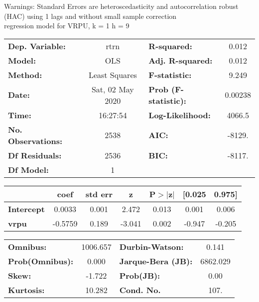 Warnings: \newline
 [1] Standard Errors are heteroscedasticity and autocorrelation robust (HAC) using 1 lags and without small sample correction\\ 

regression model for VRPU, k = 1 h = 9\begin{center}
\begin{tabular}{lclc}
\toprule
\textbf{Dep. Variable:}    &       rtrn       & \textbf{  R-squared:         } &     0.012   \\
\textbf{Model:}            &       OLS        & \textbf{  Adj. R-squared:    } &     0.012   \\
\textbf{Method:}           &  Least Squares   & \textbf{  F-statistic:       } &     9.249   \\
\textbf{Date:}             & Sat, 02 May 2020 & \textbf{  Prob (F-statistic):} &  0.00238    \\
\textbf{Time:}             &     16:27:54     & \textbf{  Log-Likelihood:    } &    4066.5   \\
\textbf{No. Observations:} &        2538      & \textbf{  AIC:               } &    -8129.   \\
\textbf{Df Residuals:}     &        2536      & \textbf{  BIC:               } &    -8117.   \\
\textbf{Df Model:}         &           1      & \textbf{                     } &             \\
\bottomrule
\end{tabular}
\begin{tabular}{lcccccc}
                   & \textbf{coef} & \textbf{std err} & \textbf{z} & \textbf{P$> |$z$|$} & \textbf{[0.025} & \textbf{0.975]}  \\
\midrule
\textbf{Intercept} &       0.0033  &        0.001     &     2.472  &         0.013        &        0.001    &        0.006     \\
\textbf{vrpu}      &      -0.5759  &        0.189     &    -3.041  &         0.002        &       -0.947    &       -0.205     \\
\bottomrule
\end{tabular}
\begin{tabular}{lclc}
\textbf{Omnibus:}       & 1006.657 & \textbf{  Durbin-Watson:     } &    0.141  \\
\textbf{Prob(Omnibus):} &   0.000  & \textbf{  Jarque-Bera (JB):  } & 6862.029  \\
\textbf{Skew:}          &  -1.722  & \textbf{  Prob(JB):          } &     0.00  \\
\textbf{Kurtosis:}      &  10.282  & \textbf{  Cond. No.          } &     107.  \\
\bottomrule
\end{tabular}
\end{center}

